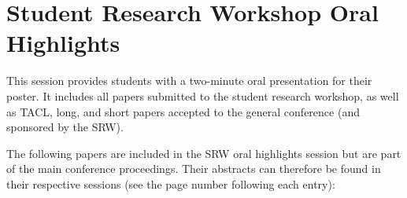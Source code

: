 
\section[SRW Oral Highlights]{Student Research Workshop Oral Highlights}
\label{srw-oral-session}

This session provides students with a two-minute oral presentation for
their poster. It includes all papers submitted to the student research
workshop, as well as TACL, long, and short papers accepted to the general
conference (and sponsored by the SRW).



\vspace{0.5in} The following papers are included in the SRW oral
highlights session but are part of the main conference proceedings.
Their abstracts can therefore be found in their respective sessions
(see the page number following each entry):

